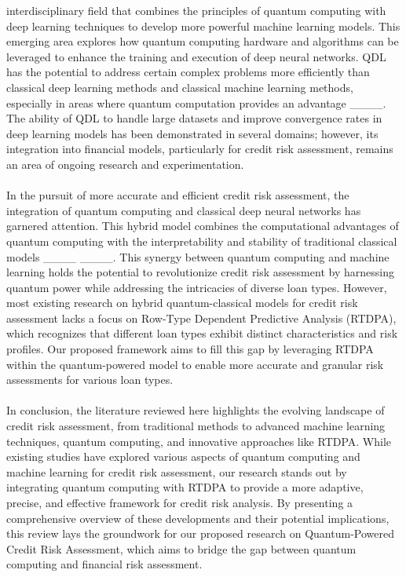 interdisciplinary field that combines the principles of quantum computing with deep learning techniques to develop more powerful machine learning models. This emerging area explores how quantum computing hardware and algorithms can be leveraged to enhance the training and execution of deep neural networks. QDL has the potential to address certain complex problems more efficiently than classical deep learning methods and classical machine learning methods, especially in areas where quantum computation provides an advantage ____. The ability of QDL to handle large datasets and improve convergence rates in deep learning models has been demonstrated in several domains; however, its integration into financial models, particularly for credit risk assessment, remains an area of ongoing research and experimentation.\\\\ In the pursuit of more accurate and efficient credit risk assessment, the integration of quantum computing and classical deep neural networks has garnered attention. This hybrid model combines the computational advantages of quantum computing with the interpretability and stability of traditional classical models ____ ____. This synergy between quantum computing and machine learning holds the potential to revolutionize credit risk assessment by harnessing quantum power while addressing the intricacies of diverse loan types. However, most existing research on hybrid quantum-classical models for credit risk assessment lacks a focus on Row-Type Dependent Predictive Analysis (RTDPA), which recognizes that different loan types exhibit distinct characteristics and risk profiles. Our proposed framework aims to fill this gap by leveraging RTDPA within the quantum-powered model to enable more accurate and granular risk assessments for various loan types.\\\\ In conclusion, the literature reviewed here highlights the evolving landscape of credit risk assessment, from traditional methods to advanced machine learning techniques, quantum computing, and innovative approaches like RTDPA. While existing studies have explored various aspects of quantum computing and machine learning for credit risk assessment, our research stands out by integrating quantum computing with RTDPA to provide a more adaptive, precise, and effective framework for credit risk analysis. By presenting a comprehensive overview of these developments and their potential implications, this review lays the groundwork for our proposed research on Quantum-Powered Credit Risk Assessment, which aims to bridge the gap between quantum computing and financial risk assessment.